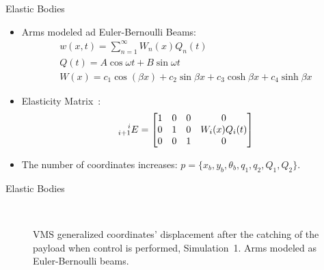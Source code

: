 \begin{frame}{Elastic Bodies}
  \begin{itemize}
    \item Arms modeled ad Euler-Bernoulli Beams:
    \begin{equation}
      \begin{array}{c}
      w(x,t)=\sum_{n=1}^\infty W_n(x)Q_n(t)\\
      Q(t)=A\cos{\omega t}+B\sin{\omega t}\\
      W(x)=c_1\cos(\beta x)+c_2\sin{\beta x}+c_3\cosh{\beta x}+c_4\sinh{\beta x}
      \end{array}
    \end{equation}
    \item Elasticity Matrix~\cite{elasticity}:
    \begin{equation}
      \prescript{i}{i+1}{E}=\begin{bmatrix}
        1&0&0&0\\
        0&1&0&W_i(x)Q_i(t)\\
        0&0&1&0
      \end{bmatrix}
    \end{equation}
    \item The number of coordinates increases: $p=\{x_b,y_b,\theta_b,q_1,q_2,Q_1,Q_2\}$.
  \end{itemize}
\end{frame}

\begin{frame}{Elastic Bodies}
  \begin{figure}
      \centering
      \subfloat
      {} \quad
    \subfloat
      {} \quad
      \subfloat
      {} \\
      \subfloat
      {} \quad
      \subfloat
      {} \quad
      \subfloat
      {} 
      \caption{VMS generalized coordinates’ displacement after the catching of the payload when control is performed, Simulation~1. Arms modeled as Euler-Bernoulli beams.}
    \end{figure}
\end{frame}

